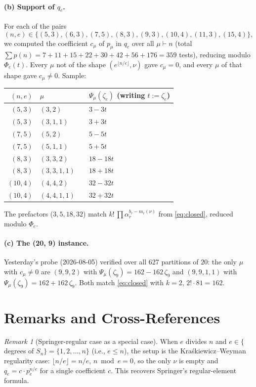 \documentclass[11pt]{article}
\theoremstyle{remark}
\newtheorem{remark}[theorem]{Remark}
\newcommand{\qe}{q_e}
\newcommand{\zetae}{\zeta_e}
\begin{document}
\paragraph{(b) Support of $\qe$.} For each of the pairs
\[
  (n, e) \in \{(5, 3), (6, 3), (7, 5), (8, 3), (9, 3), (10, 4), (11, 3), (15, 4)\},
\]
we computed the coefficient $c_\mu$ of $p_\mu$ in $\qe$ over all $\mu \vdash n$ (total $\sum p(n) = 7 + 11 + 15 + 22 + 30 + 42 + 56 + 176 = 359$ tests), reducing modulo $\Phi_e(t)$. Every $\mu$ not of the shape $(e^{\lfloor n/e\rfloor}, \nu)$ gave $c_\mu = 0$, and every $\mu$ of that shape gave $c_\mu \ne 0$. Sample:
\begin{center}
\begin{tabular}{rlrl}
\hline
$(n, e)$ & $\mu$ & & $\Psi_\mu(\zetae)$ (writing $t := \zetae$) \\
\hline
$(5, 3)$ & $(3, 2)$ & & $3 - 3t$ \\
$(5, 3)$ & $(3, 1, 1)$ & & $3 + 3t$ \\
$(7, 5)$ & $(5, 2)$ & & $5 - 5t$ \\
$(7, 5)$ & $(5, 1, 1)$ & & $5 + 5t$ \\
$(8, 3)$ & $(3, 3, 2)$ & & $18 - 18t$ \\
$(8, 3)$ & $(3, 3, 1, 1)$ & & $18 + 18t$ \\
$(10, 4)$ & $(4, 4, 2)$ & & $32 - 32t$ \\
$(10, 4)$ & $(4, 4, 1, 1)$ & & $32 + 32t$ \\
\hline
\end{tabular}
\end{center}
The prefactors ($3, 5, 18, 32$) match $k!\, \prod \alpha_r^{b_r - m_r(\nu)}$ from \eqref{eq:closed}, reduced modulo $\Phi_e$.

\paragraph{(c) The (20, 9) instance.} Yesterday's probe (2026-08-05) verified over all 627 partitions of $20$: the only $\mu$ with $c_\mu \ne 0$ are $(9, 9, 2)$ with $\Psi_\mu(\zeta_9) = 162 - 162\, \zeta_9$ and $(9, 9, 1, 1)$ with $\Psi_\mu(\zeta_9) = 162 + 162\, \zeta_9$. Both match \eqref{eq:closed} with $k = 2$, $2! \cdot 81 = 162$.

\section{Remarks and Cross-References}

\begin{remark}[Springer-regular case as a special case]
When $e$ divides $n$ and $e \in \{$degrees of $S_n\} = \{1, 2, \ldots, n\}$ (i.e., $e \le n$), the setup is the Kra\'skiewicz--Weyman regularity case: $\lfloor n/e\rfloor = n/e$, $n \bmod e = 0$, so the only $\nu$ is empty and $\qe = c \cdot p_e^{n/e}$ for a single coefficient $c$. This recovers Springer's regular-element formula.
\end{remark}
\end{document}
